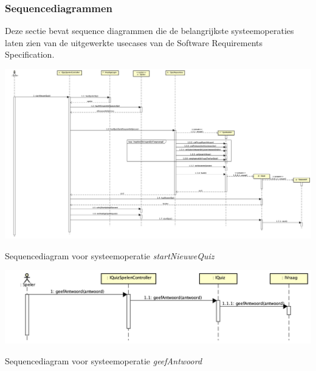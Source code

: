 \subsubsection{Sequencediagrammen}
Deze sectie bevat sequence diagrammen die de belangrijkste systeemoperaties laten zien van de uitgewerkte usecases van de Software Requirements Specification.

\begin{mpfigure}
    \includegraphics[width=\linewidth]{../Afbeeldingen/Sequence diagrammen/startNieuweQuiz.png}
    \caption{Sequencediagram voor systeemoperatie \textit{startNieuweQuiz}}
    \label{fig:startnieuwequiz}
\end{mpfigure}

\begin{mpfigure}
    \includegraphics[width=\linewidth]{../Afbeeldingen/Sequence diagrammen/geefAntwoord.png}
    \caption{Sequencediagram voor systeemoperatie \textit{geefAntwoord}}
    \label{fig:geefantwoord}
\end{mpfigure}

